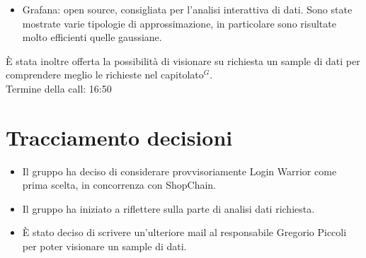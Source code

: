 \begin{itemize}
	\item Grafana: open source, consigliata per l'analisi interattiva di dati. Sono state mostrate varie tipologie di approssimazione, in particolare sono risultate molto efficienti quelle gaussiane.
\end{itemize}

\noindent 
\`E stata inoltre offerta la possibilità di visionare su richiesta un sample di dati per comprendere meglio le richieste nel capitolato$^{G}$. \\
Termine della call: 16:50

\section{Tracciamento decisioni}

\begin{itemize}
	\item Il gruppo ha deciso di considerare provvisoriamente Login Warrior come prima scelta, in concorrenza con ShopChain.
	\item Il gruppo ha iniziato a riflettere sulla parte di analisi dati richiesta.
	\item \`E stato deciso di scrivere un'ulteriore mail al responsabile Gregorio Piccoli per poter visionare un sample di dati.
\end{itemize}